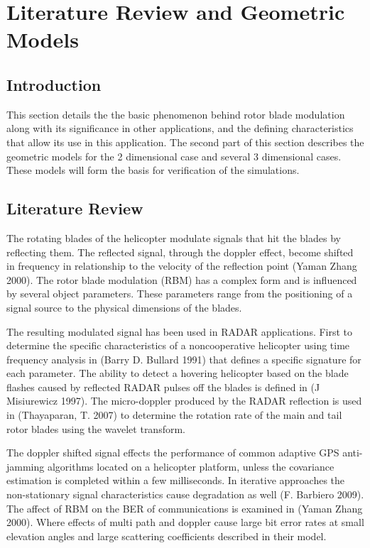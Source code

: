 \chapter{Literature Review and Geometric Models} \label{ch:background}

\section{Introduction}
This section details the the basic phenomenon behind rotor blade modulation along with its significance in other applications, and the defining characteristics that allow its use in this application. The second part of this section describes the geometric models for the 2 dimensional case and several 3 dimensional cases. These models will form the basis for verification of the simulations.

\section{Literature Review}
The rotating blades of the helicopter modulate signals that hit the blades by reflecting them. The reflected signal, through the doppler effect, become shifted in frequency in relationship to the velocity of the reflection point (Yaman Zhang 2000). The rotor blade modulation (RBM) has a complex form and is influenced by several object parameters. These parameters range from the positioning of a signal source to the physical dimensions of the blades. 

The resulting modulated signal has been used in RADAR applications. First to determine the specific characteristics of a noncooperative helicopter using time frequency analysis in (Barry D. Bullard 1991) that defines a specific signature for each parameter. The ability to detect a hovering helicopter based on the blade flashes caused by reflected RADAR pulses off the blades is defined in (J Misiurewicz 1997). The micro-doppler produced by the RADAR reflection is used in (Thayaparan, T. 2007) to determine the rotation rate of the main and tail rotor blades using the wavelet transform.

The doppler shifted signal effects the performance of common adaptive GPS anti-jamming algorithms located on a helicopter platform, unless the covariance estimation is completed within a few milliseconds. In iterative approaches the non-stationary signal characteristics cause degradation as well (F. Barbiero 2009). The affect of RBM on the BER of communications is examined in (Yaman Zhang 2000). Where effects of multi path and doppler cause large bit error rates at small elevation angles and large scattering coefficients described in their model.


